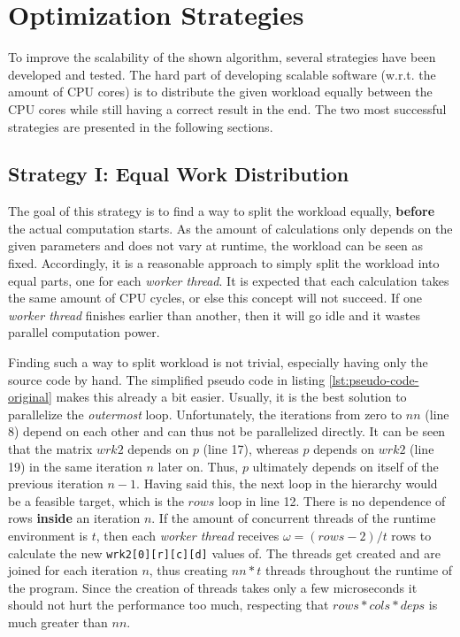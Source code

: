 \section{Optimization Strategies}
\label{sec:strategies}

To improve the scalability of the shown algorithm, several strategies have been developed and tested. The hard part of developing scalable software (w.r.t. the amount of CPU cores) is to distribute the given workload equally between the CPU cores while still having a correct result in the end. The two most successful strategies are presented in the following sections.

\subsection{Strategy I: Equal Work Distribution}
\label{ssec:strategy-i}

The goal of this strategy is to find a way to split the workload equally, \textbf{before} the actual computation starts. As the amount of calculations only depends on the given parameters and does not vary at runtime, the workload can be seen as fixed. Accordingly, it is a reasonable approach to simply split the workload into equal parts, one for each \textit{worker thread}. It is expected that each calculation takes the same amount of CPU cycles, or else this concept will not succeed. If one \textit{worker thread} finishes earlier than another, then it will go idle and it wastes parallel computation power.

Finding such a way to split workload is not trivial, especially having only the source code by hand. The simplified pseudo code in listing \ref{lst:pseudo-code-original} makes this already a bit easier. Usually, it is the best solution to parallelize the \textit{outermost} loop. Unfortunately, the iterations from zero to $nn$ (line 8) depend on each other and can thus not be parallelized directly. It can be seen that the matrix $wrk2$ depends on $p$ (line 17), whereas $p$ depends on $wrk2$ (line 19) in the same iteration $n$ later on. Thus, $p$ ultimately depends on itself of the previous iteration $n-1$. Having said this, the next loop in the hierarchy would be a feasible target, which is the $rows$ loop in line 12. There is no dependence of rows \textbf{inside} an iteration $n$. If the amount of concurrent threads of the runtime environment is $t$, then each \textit{worker thread} receives $\omega = (rows-2) / t$ rows to calculate the new \verb$wrk2[0][r][c][d]$ values of. The threads get created and are joined for each iteration $n$, thus creating $nn*t$ threads throughout the runtime of the program. Since the creation of threads takes only a few microseconds it should not hurt the performance too much, respecting that $rows*cols*deps$ is much greater than $nn$.

